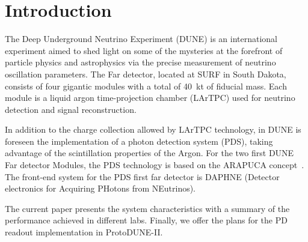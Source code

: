 \section{Introduction}
\label{sec:introduction}

The Deep Underground Neutrino Experiment (DUNE) is an international experiment aimed to shed light on some of the mysteries at the forefront of particle physics and astrophysics via the precise measurement of neutrino oscillation parameters. The Far detector, located at SURF in South Dakota, consists of four gigantic modules with a total of \SI{40}{\kilo\tonne} of fiducial mass. Each module is a  liquid argon time-projection chamber (LArTPC) used for neutrino detection and signal reconstruction. \cite{Abi_2020,Abi_2020_2,Abi_2020_3}

In addition to the charge collection allowed by LArTPC technology, in DUNE is foreseen the implementation of a photon detection system (PDS), taking advantage of the scintillation properties of the Argon. For the two first DUNE Far detector Modules, the PDS technology is based on the ARAPUCA concept~\cite{Machado_2016}. The front-end system for the PDS first far detector is DAPHNE (Detector electronics for Acquiring PHotons from NEutrinos).

The current paper presents the system characteristics with a summary of the performance achieved in different labs. Finally,  we offer the plans for the PD readout implementation in ProtoDUNE-II.

